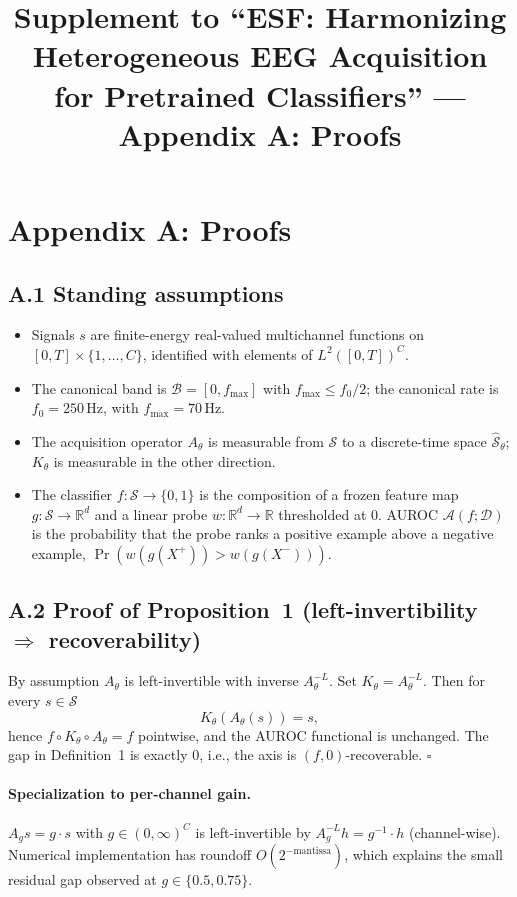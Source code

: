 \documentclass[conference]{IEEEtran}
\title{Supplement to ``ESF: Harmonizing Heterogeneous EEG Acquisition for
Pretrained Classifiers'' --- Appendix A: Proofs}
\author{\IEEEauthorblockN{Hitesh Dammu}
\IEEEauthorblockA{Independent Researcher, Hyderabad, India \\ hdammu@asu.edu}}
\begin{document}
\maketitle

\section*{Appendix A: Proofs}

\subsection*{A.1 Standing assumptions}
\begin{itemize}\itemsep0pt
\item[(S1)] Signals $s$ are finite-energy real-valued multichannel
functions on $[0,T] \times \{1,\dots,C\}$, identified with elements of
$L^2([0,T])^C$.
\item[(S2)] The canonical band is $\mathcal{B} = [0, f_{\max}]$ with
$f_{\max} \le f_0/2$; the canonical rate is $f_0{=}250$\,Hz, with
$f_{\max}{=}70$\,Hz.
\item[(S3)] The acquisition operator $A_\theta$ is measurable from
$\mathcal{S}$ to a discrete-time space $\hat{\mathcal{S}}_\theta$;
$K_\theta$ is measurable in the other direction.
\item[(S4)] The classifier $f : \mathcal{S} \to \{0,1\}$ is the
composition of a frozen feature map $g : \mathcal{S} \to \mathbb{R}^d$
and a linear probe $w : \mathbb{R}^d \to \mathbb{R}$ thresholded at
$0$. AUROC $\mathcal{A}(f; \mathcal{D})$ is the probability that the
probe ranks a positive example above a negative example,
$\Pr(w(g(X^+)) > w(g(X^-)))$.
\end{itemize}

\subsection*{A.2 Proof of Proposition~1 (left-invertibility $\Rightarrow$ recoverability)}
By assumption $A_\theta$ is left-invertible with inverse
$A_\theta^{-L}$. Set $K_\theta = A_\theta^{-L}$. Then for every
$s \in \mathcal{S}$
\[ K_\theta(A_\theta(s)) = s, \]
hence $f \circ K_\theta \circ A_\theta = f$ pointwise, and the AUROC
functional is unchanged. The gap in Definition~1 is exactly $0$,
i.e., the axis is $(f,0)$-recoverable. $\square$

\paragraph{Specialization to per-channel gain.} $A_g s = g \cdot s$
with $g \in (0, \infty)^C$ is left-invertible by $A_g^{-L} h = g^{-1}
\cdot h$ (channel-wise). Numerical implementation has roundoff
$O(2^{-\text{mantissa}})$, which explains the small residual gap
observed at $g \in \{0.5, 0.75\}$.
\end{document}
